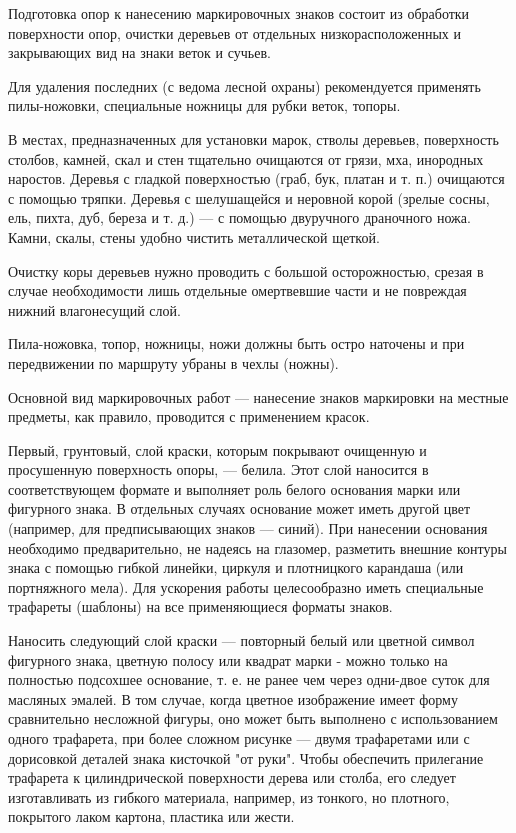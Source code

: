\documentclass[a4paper,12pt,titlepage]{extarticle}
\begin{document}
Подготовка опор к нанесению маркировочных знаков состоит из обработки поверхности опор, очистки деревьев от отдельных
низкорасположенных и закрывающих вид на знаки веток и сучьев.

Для удаления последних (с ведома лесной охраны) рекомендуется применять пилы-ножовки, специальные ножницы для рубки
веток, топоры.

В местах, предназначенных для установки марок, стволы деревьев, поверхность столбов, камней, скал и стен тщательно
очищаются от грязи, мха, инородных наростов. Деревья с гладкой поверхностью (граб, бук, платан и т. п.) очищаются с
помощью тряпки. Деревья с шелушащейся и неровной корой (зрелые сосны, ель, пихта, дуб, береза и т. д.) --- с помощью
двуручного драночного ножа. Камни, скалы, стены удобно чистить металлической щеткой.

Очистку коры деревьев нужно проводить с большой осторожностью, срезая в случае необходимости лишь отдельные омертвевшие
части и не повреждая нижний влагонесущий слой.

Пила-ножовка, топор, ножницы, ножи должны быть остро наточены и при передвижении по маршруту убраны в чехлы (ножны).

Основной вид маркировочных работ --- нанесение знаков маркировки на местные предметы, как правило, проводится с
применением красок.

Первый, грунтовый, слой краски, которым покрывают очищенную и просушенную поверхность опоры, --- белила. Этот слой
наносится в соответствующем формате и выполняет роль белого основания марки или фигурного знака. В отдельных случаях
основание может иметь другой цвет (например, для предписывающих знаков --- синий). При нанесении основания необходимо
предварительно, не надеясь на глазомер, разметить внешние контуры знака с помощью гибкой линейки, циркуля и плотницкого
карандаша (или портняжного мела). Для ускорения работы целесообразно иметь специальные трафареты (шаблоны) на все
применяющиеся форматы знаков.

Наносить следующий слой краски --- повторный белый или цветной символ фигурного знака, цветную полосу или квадрат марки -
можно только на полностью подсохшее основание, т. е. не ранее чем через одни-двое суток для масляных эмалей. В том случае, когда цветное
изображение имеет форму сравнительно несложной фигуры, оно может быть выполнено с использованием одного трафарета, при
более сложном рисунке --- двумя трафаретами или с дорисовкой деталей знака кисточкой "от руки". Чтобы обеспечить
прилегание трафарета к цилиндрической поверхности дерева или столба, его следует изготавливать из гибкого материала,
например, из тонкого, но плотного, покрытого лаком картона, пластика или жести.
\end{document}
